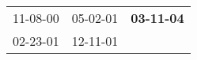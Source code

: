\begin{supertabular}{p{0.33\columnwidth}p{0.33\columnwidth}p{0.33\columnwidth}}
 11-08-00\textsuperscript{} &  05-02-01\textsuperscript{} &  \textbf{03-11-04\textsuperscript{}} \\
 02-23-01\textsuperscript{} &  12-11-01\textsuperscript{} &                                      \\
\end{supertabular}
